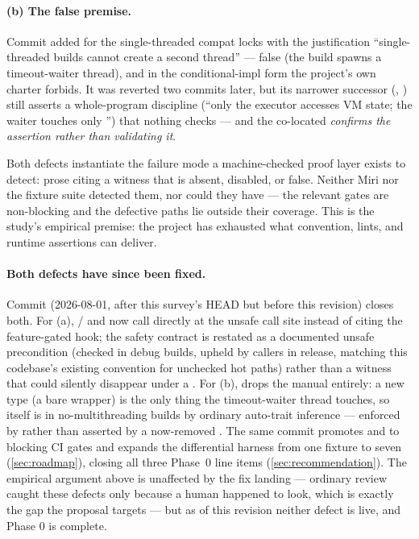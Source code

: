 \paragraph{(b) The false  premise.} Commit 
added  for the single-threaded compat
locks with the justification ``single-threaded builds cannot create a
second thread'' --- false (the build spawns a timeout-waiter thread), and
in the conditional-impl form the project's own charter forbids. It was
reverted two commits later, but its narrower successor
(,
) still asserts a whole-program discipline
(``only the executor accesses VM state; the waiter touches only
'') that nothing checks --- and the co-located
 \emph{confirms the assertion rather than
validating it}.

Both defects instantiate the failure mode a machine-checked proof
layer exists to detect: prose citing a witness that is absent,
disabled, or false. Neither Miri nor the fixture suite detected them,
nor could they have --- the relevant gates are non-blocking and the
defective paths lie outside their coverage. This is the study's
empirical premise: the project has exhausted what convention, lints,
and runtime assertions can deliver.

\paragraph{Both defects have since been fixed.} Commit
 (2026-08-01, after this survey's HEAD but before this
revision) closes both. For (a),
/ and
 now call  directly at the
unsafe call site instead of citing the feature-gated
 hook; the safety contract is restated as a
documented unsafe precondition (checked in debug builds, upheld by
callers in release, matching this codebase's existing convention for
unchecked hot paths) rather than a witness that could silently
disappear under a . For (b),  drops
the manual  entirely: a new
 type (a bare  wrapper) is the
only thing the timeout-waiter thread touches, so 
itself is  in no-multithreading builds by ordinary
auto-trait inference --- enforced by 
rather than asserted by a now-removed . The
same commit promotes  and 
to blocking CI gates and expands the differential harness from one
fixture to seven (\cref{sec:roadmap}), closing all three Phase~0 line
items (\cref{sec:recommendation}). The empirical argument above is
unaffected by the fix landing --- ordinary review caught these defects
only because a human happened to look, which is exactly the gap the
proposal targets --- but as of this revision neither defect is live,
and Phase 0 is complete.
